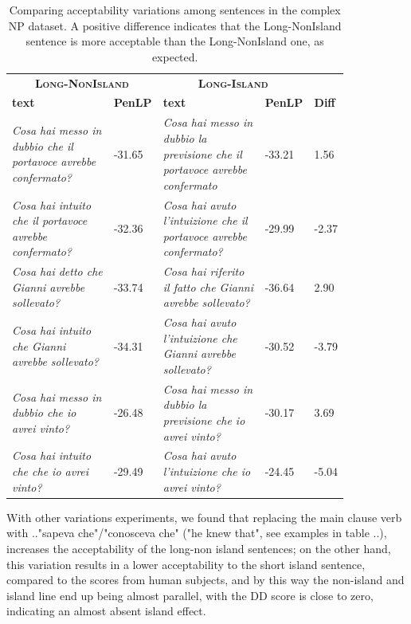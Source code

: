 \begin{table} \scriptsize 
	\begin{center}
		\begin{tabular}
			{p{0.3\linewidth} p{0.08\linewidth} p{0.3\linewidth} p{0.08\linewidth} p{0.08\linewidth}|} \\
			\multicolumn{2}{c}{\textbf{\textsc{Long-NonIsland}}} & \multicolumn{2}{c}{\textbf{\textsc{Long-Island}}}  &   \\
			\textbf{text} & \textbf{PenLP} & \textbf{text} & \textbf{PenLP} &  \textbf{Diff}  \\
			\hline
			\textit{Cosa hai messo in dubbio che il portavoce avrebbe confermato?} & -31.65
			& \textit{Cosa hai messo in dubbio la previsione che il portavoce avrebbe confermato} & -33.21 & 1.56 \\ 
			\textit{Cosa hai intuito che il portavoce avrebbe confermato?} & -32.36 
			& \textit{Cosa hai avuto l'intuizione che il portavoce avrebbe confermato?} & -29.99 & -2.37 \\ 	
			\textit{Cosa hai detto che Gianni avrebbe sollevato?} & -33.74 
			& \textit{Cosa hai riferito il fatto che Gianni avrebbe sollevato?} & -36.64 & 2.90 \\ 
			\textit{Cosa hai intuito che Gianni avrebbe sollevato?} & -34.31 
			& \textit{Cosa hai avuto l'intuizione che Gianni avrebbe sollevato?} & -30.52  & -3.79 \\ 
			
			\textit{Cosa hai messo in dubbio che io avrei vinto?} & -26.48 & 
			\textit{Cosa hai messo in dubbio la previsione che io avrei vinto?} & -30.17 & 3.69\\ 				
			\textit{Cosa hai intuito che che io avrei vinto?} & -29.49 & 
			\textit{Cosa hai avuto l'intuizione che io avrei vinto?} & -24.45  & -5.04 \\ 				

		\end{tabular}
		\caption{Comparing acceptability variations among sentences in the complex NP dataset. A positive difference indicates that the Long-NonIsland sentence is more acceptable than the Long-NonIsland one, as expected.}
		\label{tab:compare1}
	\end{center}
\end{table}



With other variations experiments, we found that replacing the main clause verb with .."sapeva che"/"conosceva che" ("he knew that", see examples in table ..), increases the acceptability of the long-non island sentences; on the other hand, this variation results in a lower acceptability to the short island sentence, compared to the scores from human subjects, and by this way the non-island and island line end up being almost parallel, with the DD score is close to zero, indicating an almost absent island effect.

